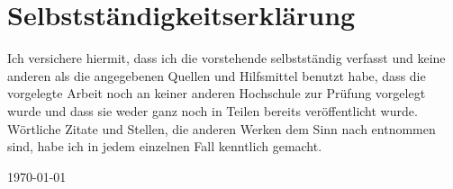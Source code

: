 
\section*{Selbstständigkeitserklärung}

Ich versichere hiermit, dass ich die vorstehende  selbstständig verfasst und keine anderen als die angegebenen Quellen und Hilfsmittel benutzt habe, dass die vorgelegte Arbeit noch an keiner anderen Hochschule zur Prüfung vorgelegt wurde und dass sie weder ganz noch in Teilen bereits veröffentlicht wurde. Wörtliche Zitate und Stellen, die anderen Werken dem Sinn nach entnommen sind, habe ich in jedem einzelnen Fall kenntlich gemacht.

\vspace{\baselineskip}

\noindent%
\datengerman\today%

\vspace{3\baselineskip}

\noindent \thesisauthor

\thispagestyle{empty}